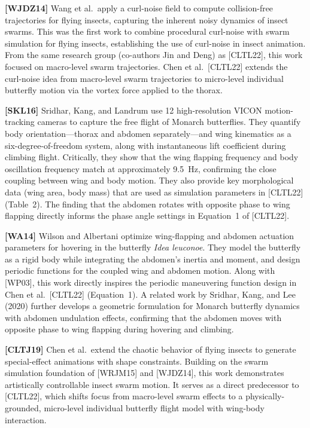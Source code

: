 \documentclass[12pt]{article}
\begin{document}
\bigskip\noindent
\textbf{[WJDZ14]} Wang et al.\ apply a curl-noise field to compute
collision-free trajectories for flying insects, capturing the inherent noisy
dynamics of insect swarms. This was the first work to combine procedural
curl-noise with swarm simulation for flying insects, establishing the use of
curl-noise in insect animation. From the same research group (co-authors Jin and
Deng) as [CLTL22], this work focused on macro-level swarm trajectories.
Chen et al.\ [CLTL22] extends the curl-noise idea from macro-level swarm
trajectories to micro-level individual butterfly motion via the vortex force
applied to the thorax.

\bigskip\noindent
\textbf{[SKL16]} Sridhar, Kang, and Landrum use 12 high-resolution VICON
motion-tracking cameras to capture the free flight of Monarch butterflies. They
quantify body orientation---thorax and abdomen separately---and wing kinematics as
a six-degree-of-freedom system, along with instantaneous lift coefficient during
climbing flight. Critically, they show that the wing flapping frequency and body
oscillation frequency match at approximately 9.5~Hz, confirming the close coupling
between wing and body motion. They also provide key morphological data (wing area,
body mass) that are used as simulation parameters in [CLTL22] (Table~2). The
finding that the abdomen rotates with opposite phase to wing flapping directly
informs the phase angle settings in Equation~1 of [CLTL22].

\bigskip\noindent
\textbf{[WA14]} Wilson and Albertani optimize wing-flapping and abdomen actuation
parameters for hovering in the butterfly \textit{Idea leuconoe}. They model the
butterfly as a rigid body while integrating the abdomen's inertia and moment, and
design periodic functions for the coupled wing and abdomen motion. Along with
[WP03], this work directly inspires the periodic maneuvering function design in
Chen et al.\ [CLTL22] (Equation~1). A related work by Sridhar, Kang, and Lee
(2020) further develops a geometric formulation for Monarch butterfly dynamics
with abdomen undulation effects, confirming that the abdomen moves with opposite
phase to wing flapping during hovering and climbing.

\bigskip\noindent
\textbf{[CLTJ19]} Chen et al.\ extend the chaotic behavior of flying insects to
generate special-effect animations with shape constraints. Building on the swarm
simulation foundation of [WRJM15] and [WJDZ14], this work demonstrates
artistically controllable insect swarm motion. It serves as a direct predecessor
to [CLTL22], which shifts focus from macro-level swarm effects to a
physically-grounded, micro-level individual butterfly flight model with wing-body
interaction.
\end{document}
